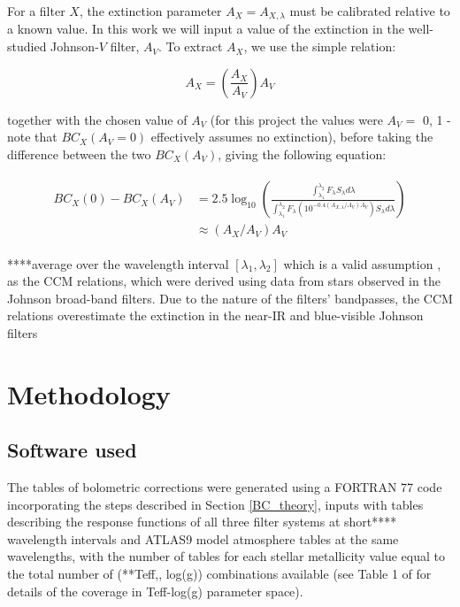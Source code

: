 \documentclass[12pt, a4paper]{report}
\begin{document}
For a filter $X$, the extinction parameter $A_{X} = A_{X,\lambda}$ must be calibrated relative to a known value. In this work we will input a value of the extinction in the well-studied Johnson-$V$ filter, $A_{V}$. To extract $A_{X}$, we use the simple relation:

\begin{equation}
A_{X} = \left( \frac{A_{X}}{A_{V}} \right) A_{V}
\label{ratio_eq}
\end{equation}

together with the chosen value of $A_{V}$ (for this project the values were $A_{V} =$ 0, 1 - note that $BC_{X}(A_{V}=0)$ effectively assumes no extinction), before taking the difference between the two $BC_{X}(A_{V})$, giving the following equation:

\begin{align}
\begin{split}
BC_{X}(0) - BC_{X}(A_{V}) &= 2.5 \log_{10} \left( \frac{\int_{\lambda_{1}}^{\lambda_{2}} F_{\lambda}  S_{\lambda} d\lambda}{\int_{\lambda_{1}}^{\lambda_{2}} F_{\lambda}\left( 10^{-0.4 \left(A_{X,\lambda}/A_{V}\right)A_{V}} \right) S_{\lambda} d\lambda} \right)
\\ &\approx \left(A_{X}/A_{V}\right)A_{V}
\label{BCs_diff}
\end{split}
\end{align}

****average over the wavelength interval $[\lambda_{1},\lambda_{2}]$ which is a valid assumption \citep{2014MNRAS.444..392C}, as the CCM relations, which were derived using data from stars observed in the Johnson broad-band filters. Due to the nature of the filters' bandpasses, the CCM relations overestimate the extinction in the near-IR and blue-visible Johnson filters

\chapter{Methodology}
\section{Software used}
The tables of bolometric corrections were generated using a FORTRAN 77 code incorporating the steps described in Section \ref{BC_theory}, inputs with tables describing the response functions of all three filter systems at short**** wavelength intervals and ATLAS9 model atmosphere tables at the same wavelengths, with the number of tables for each stellar metallicity value equal to the total number of (**Teff,, log(g)) combinations available (see Table 1 of \cite{2004astro.ph..5087C} for details of the coverage in Teff-log(g) parameter space).
\end{document}
